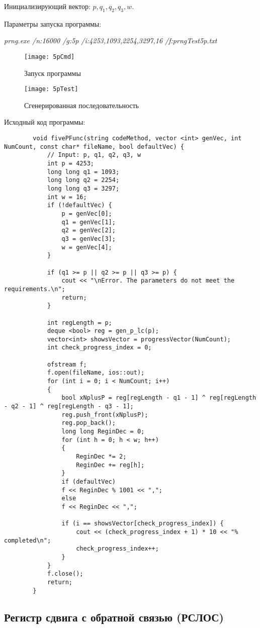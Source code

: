 \documentclass[bachelor, och, coursework]{shiza}
\begin{document}
	Инициализирующий вектор: $p, q_1, q_2, q_3, w$.
	
	Параметры запуска программы:
	
	\textit{prng.exe /n:16000 /g:5p /i:4253,1093,2254,3297,16 /f:prngTest5p.txt}
	
	\begin{figure}[H]
		\centering
		\texttt{[image: 5pCmd]}
		\caption{Запуск программы}
		\label{fig:5pCmd}
	\end{figure}
	
	\begin{figure}[H]
		\centering
		\texttt{[image: 5pTest]}
		\caption{Сгенерированная последовательность}
		\label{fig:5pTest}
	\end{figure}
	
		Исходный код программы:
	
	\begin{verbatim}
		void fivePFunc(string codeMethod, vector <int> genVec, int NumCount, const char* fileName, bool defaultVec) {
			// Input: p, q1, q2, q3, w
			int p = 4253;
			long long q1 = 1093;
			long long q2 = 2254;
			long long q3 = 3297;
			int w = 16;
			if (!defaultVec) {
				p = genVec[0];
				q1 = genVec[1];
				q2 = genVec[2];
				q3 = genVec[3];
				w = genVec[4];
			}
			
			if (q1 >= p || q2 >= p || q3 >= p) {
				cout << "\nError. The parameters do not meet the requirements.\n";
				return;
			}
			
			int regLength = p;
			deque <bool> reg = gen_p_lc(p);
			vector<int> showsVector = progressVector(NumCount);
			int check_progress_index = 0;
			
			ofstream f;
			f.open(fileName, ios::out);
			for (int i = 0; i < NumCount; i++)
			{
				bool xNplusP = reg[regLength - q1 - 1] ^ reg[regLength - q2 - 1] ^ reg[regLength - q3 - 1];
				reg.push_front(xNplusP);
				reg.pop_back();
				long long ReginDec = 0;
				for (int h = 0; h < w; h++)
				{
					ReginDec *= 2;
					ReginDec += reg[h];
				}
				if (defaultVec)
				f << ReginDec % 1001 << ",";
				else
				f << ReginDec << ",";
				
				if (i == showsVector[check_progress_index]) {
					cout << (check_progress_index + 1) * 10 << "% completed\n";
					check_progress_index++;
				}
			}
			f.close();
			return;
		}
	\end{verbatim}
	
	
	\subsection{Регистр сдвига с обратной связью (РСЛОС)}
	
\end{document}
